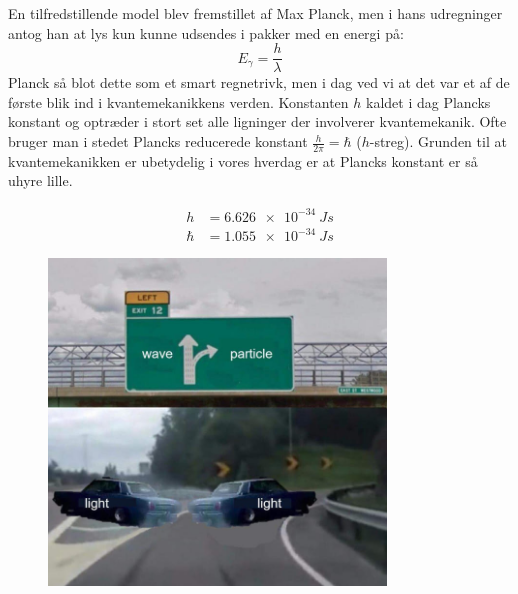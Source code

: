 \documentclass[../Kvantemekanik.tex]{subfiles}
\begin{document}
En tilfredstillende model blev fremstillet af Max Planck, men i hans udregninger antog han at lys kun kunne udsendes i pakker med en energi på:
\begin{equation}
E_\gamma = \frac{h}{\lambda}
\end{equation}
Planck så blot dette som et smart regnetrivk, men i dag ved vi at det var et af de første blik ind i kvantemekanikkens verden. Konstanten $h$ kaldet i dag Plancks konstant og optræder i stort set alle ligninger der involverer kvantemekanik. Ofte bruger man i stedet Plancks reducerede konstant $\frac{h}{2\pi}=\hbar$ ($h$-streg).
Grunden til at kvantemekanikken er ubetydelig i vores hverdag er at Plancks konstant er så uhyre lille. 

\begin{align*}
h &= \SI{6.626e-34}{Js}\\
\hbar &= \SI{1.055e-34}{Js}
\end{align*}

\begin{figure}
    \centering
    \includegraphics[width = 0.8\textwidth]{Kvantemekanik/billeder/dualitet.jpg}
\end{figure}
\end{document}

